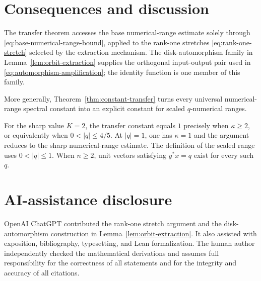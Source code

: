 \documentclass[preprints,article,submit,oneauthor]{Definitions/mdpi}
\theoremstyle{mdpi}
\theoremstyle{definition}
\begin{document}
\section{Consequences and discussion}
\label{sec:discussion}

The transfer theorem accesses the base numerical-range estimate solely
through \eqref{eq:base-numerical-range-bound}, applied to the rank-one
stretches \eqref{eq:rank-one-stretch} selected by the extraction
mechanism.  The disk-automorphism family in
Lemma~\ref{lem:orbit-extraction} supplies the orthogonal input-output
pair used in \eqref{eq:automorphism-amplification}; the identity
function is one member of this family.

More generally, Theorem~\ref{thm:constant-transfer} turns every
universal numerical-range spectral constant into an explicit constant
for scaled $q$-numerical ranges.

For the sharp value $K=2$, the transfer constant equals $1$ precisely
when $\kappa\geq2$, or equivalently when
$0<\lvert q\rvert\leq4/5$.  At $\lvert q\rvert=1$, one has
$\kappa=1$ and the argument reduces to the sharp numerical-range
estimate.  The definition of the scaled range uses
$0<\lvert q\rvert\leq1$.  When $n\geq2$, unit vectors satisfying
$y^*x=q$ exist for every such $q$.

\section*{AI-assistance disclosure}

OpenAI ChatGPT contributed the rank-one stretch argument and the
disk-automorphism construction in Lemma~\ref{lem:orbit-extraction}.
It also assisted with exposition, bibliography, typesetting, and Lean
formalization.  The human author independently checked the mathematical
derivations and assumes full responsibility for the correctness of all
statements and for the integrity and accuracy of all citations.


\end{document}

